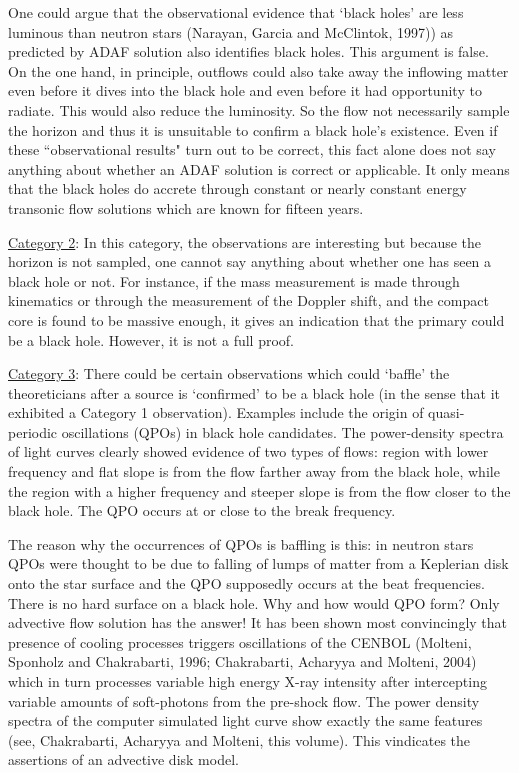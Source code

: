 \documentclass{ws-procs975x65}
\begin{document}
One could argue that the observational evidence that `black holes' 
are less luminous than neutron stars (Narayan, Garcia and McClintok, 1997)) as predicted by 
ADAF solution also identifies black holes. This argument is false.  On the 
one hand, in principle, outflows could also take away the inflowing 
matter even before it dives into the black hole and even before it had 
opportunity to radiate. This would also reduce the luminosity.  So the 
flow not necessarily sample the horizon and thus it is unsuitable 
to confirm a black hole's existence. Even if these ``observational results"
turn out to be correct, this fact alone does not say anything about whether 
an ADAF solution is correct or
applicable. It only means that the black holes do accrete through constant or nearly constant 
energy transonic flow solutions which are known for fifteen years.

\noindent \underline{Category 2}: In this category, the observations are interesting 
but because the horizon is not sampled, one cannot say anything about
whether one has seen a black hole or not. For instance, if the mass 
measurement is made through kinematics or through the measurement of 
the Doppler shift, and the compact core is found to be massive enough, 
it gives an indication that the primary could be a black hole. However, 
it is not a full proof.

\noindent \underline{Category 3}: There could be certain observations which could 
`baffle' the theoreticians after a source is `confirmed' 
to be a black hole (in the sense that it exhibited a Category 1 observation). 
Examples include the origin of quasi-periodic oscillations (QPOs) in black 
hole candidates. The power-density spectra of light curves clearly showed 
evidence of two types of flows: region with lower frequency and flat slope 
is from the flow farther away from the black hole, while the region with a 
higher frequency and steeper slope is from the flow closer to the black hole.  
The QPO occurs at or close to the break frequency.

The reason why the occurrences of QPOs is baffling is this: in neutron stars
QPOs were thought to be due to falling of lumps of matter from a Keplerian
disk onto the star surface and the QPO supposedly occurs at the beat frequencies.
There is no hard surface on a black hole. Why and how would QPO form? 
Only advective flow solution has the answer! It has been shown most 
convincingly that presence of cooling processes triggers oscillations 
of the CENBOL (Molteni, Sponholz and Chakrabarti, 1996; Chakrabarti, 
Acharyya and Molteni, 2004) which in turn processes variable high energy 
X-ray intensity after intercepting variable amounts of soft-photons from the pre-shock 
flow. The power density spectra of the computer simulated light curve show
exactly the same features (see, Chakrabarti, Acharyya and Molteni, 
this volume). This vindicates the assertions of an advective disk model.
\end{document}
